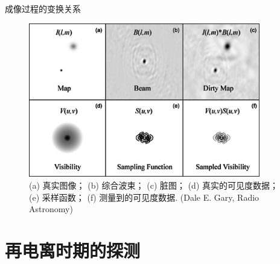 \documentclass{beamer}
\begin{document}
\begin{frame}{成像过程的变换关系}
  \begin{figure}
    \centering
    \includegraphics[width=0.9\textwidth]{imaging-relations}
    \caption{%
      (a) 真实图像；
      (b) 综合波束；
      (c) 脏图；
      (d) 真实的可见度数据；
      (e) 采样函数；
      (f) 测量到的可见度数据.
      (Dale E. Gary, Radio Astronomy)
    }
  \end{figure}
\end{frame}


\section{再电离时期的探测}
\end{document}
